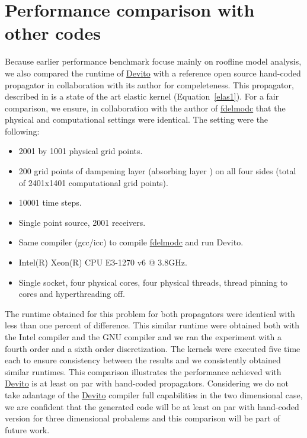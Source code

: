 \documentclass[conference]{IEEEtran}
\begin{document}
\section{Performance comparison with other
codes}\label{performance-comparison-with-other-codes}

Because earlier performance benchmark focuse mainly on roofline model
analysis, we also compared the runtime of
\href{https://github.com/devitocodes/devito}{Devito} with a reference
open source hand-coded propagator in collaboration with its author for
compeleteness. This propagator, described in \cite{thorbecke} is a
state of the art elastic kernel (Equation~\ref{elas1}). For a fair
comparison, we ensure, in collaboration with the author of
\href{https://github.com/JanThorbecke/OpenSource.git}{fdelmodc} that the
physical and computational settings were identical. The setting were the
following:

\begin{itemize}
\itemsep1pt\parskip0pt
\item
  2001 by 1001 physical grid points.
\item
  200 grid points of dampening layer (absorbing layer \cite{cerjan}) on
  all four sides (total of 2401x1401 computational grid points).
\item
  10001 time steps.
\item
  Single point source, 2001 receivers.
\item
  Same compiler (gcc/icc) to compile
  \href{https://github.com/JanThorbecke/OpenSource.git}{fdelmodc} and
  run Devito.
\item
  Intel(R) Xeon(R) CPU E3-1270 v6 @ 3.8GHz.
\item
  Single socket, four physical cores, four physical threads, thread
  pinning to cores and hyperthreading off.
\end{itemize}

The runtime obtained for this problem for both propagators were
identical with less than one percent of difference. This similar runtime
were obtained both with the Intel compiler and the GNU compiler and we
ran the experiment with a fourth order and a sixth order discretization.
The kernels were executed five time each to ensure consistency between
the results and we consistently obtained similar runtimes. This
comparison illustrates the performance achieved with
\href{https://github.com/devitocodes/devito}{Devito} is at least on par
with hand-coded propagators. Considering we do not take adantage of the
\href{https://github.com/devitocodes/devito}{Devito} compiler full
capabilities in the two dimensional case, we are confident that the
generated code will be at least on par with hand-coded version for three
dimensional probalems and this comparison will be part of future work.
\end{document}
